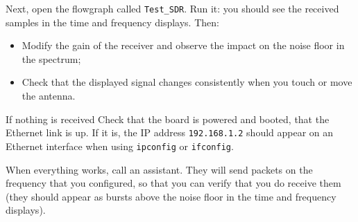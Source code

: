 Next, open the flowgraph called \texttt{Test\_SDR}. Run it: you should see the received samples in the time and frequency displays. Then:
\begin{itemize}
    \item Modify the gain of the receiver and observe the impact on the noise floor in the spectrum;
    \item Check that the displayed signal changes consistently when you touch or move the antenna.
\end{itemize}

\begin{bclogo}[couleur = gray!20, arrondi = 0.2, logo=\bcattention]{If nothing is received}
Check that the board is powered and booted, that the Ethernet link is up. If it is, the IP address \texttt{192.168.1.2} should appear on an Ethernet interface when using \texttt{ipconfig} or \texttt{ifconfig}.
\end{bclogo}

When everything works, call an assistant. They will send packets on the frequency that you configured, so that you can verify that you do receive them (they should appear as bursts above the noise floor in the time and frequency displays).
